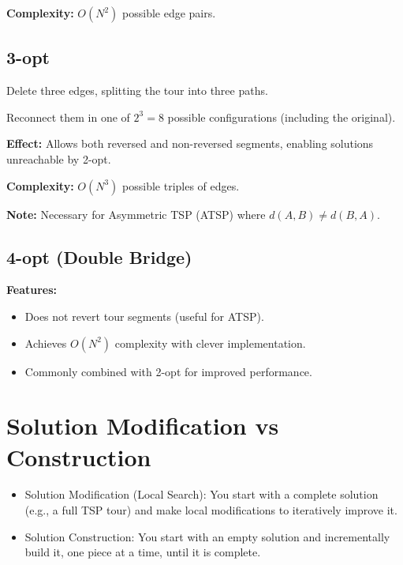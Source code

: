 \textbf{Complexity:} $O(N^2)$ possible edge pairs.

\subsection*{3-opt}
\begin{tightitemize}
    \item Delete three edges, splitting the tour into three paths.
    \item Reconnect them in one of $2^3 = 8$ possible configurations (including the original).
\end{tightitemize}
\textbf{Effect:} Allows both reversed and non-reversed segments, enabling solutions unreachable by 2-opt.  

\textbf{Complexity:} $O(N^3)$ possible triples of edges.  

\textbf{Note:} Necessary for Asymmetric TSP (ATSP) where $d(A,B) \neq d(B,A)$.

\subsection*{4-opt (Double Bridge)}
\textbf{Features:}
\begin{itemize}
    \item Does not revert tour segments (useful for ATSP).
    \item Achieves $O(N^2)$ complexity with clever implementation.
    \item Commonly combined with 2-opt for improved performance.
\end{itemize}

\section*{Solution Modification vs Construction}

\begin{itemize}
    \item Solution Modification (Local Search):
    You start with a complete solution (e.g., a full TSP tour) and make local 
    modifications  to iteratively improve it.
    \item Solution Construction:  You start with an empty solution and 
    incrementally build it, one piece at a time, until it is complete.
\end{itemize}
